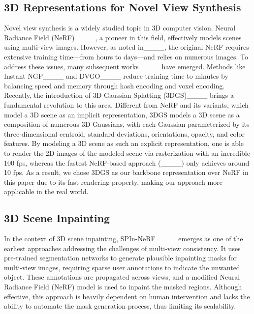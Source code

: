 \subsection{3D Representations for Novel View Synthesis}
\label{subsec:NVS}
Novel view synthesis is a widely studied topic in 3D computer vision. Neural Radiance Field (NeRF)____, a pioneer in this field, effectively models scenes using multi-view images. However, as noted in____, the original NeRF requires extensive training time—from hours to days—and relies on numerous images. To address these issues, many subsequent works____ have emerged. Methods like Instant NGP____ and DVGO____ reduce training time to minutes by balancing speed and memory through hash encoding and voxel encoding. Recently, the introduction of 3D Gaussian Splatting (3DGS)____ brings a fundamental revolution to this area. Different from NeRF and its variants, which model a 3D scene as an implicit representation, 3DGS models a 3D scene as a composition of numerous 3D Gaussians, with each Gaussian parameterized by its three-dimensional centroid, standard deviations, orientations, opacity, and color features. By modeling a 3D scene as such an explicit representation, one is able to render the 2D images of the modeled scene via rasterization with an incredible 100 fps, whereas the fastest NeRF-based approach (____) only achieves around 10 fps. As a result, we chose 3DGS as our backbone representation over NeRF in this paper due to its fast rendering property, making our approach more applicable in the real world. 
 


\subsection{3D Scene Inpainting}
\label{subsec:3Dinpaint}
In the context of 3D scene inpainting, SPIn-NeRF____ emerges as one of the earliest approaches addressing the challenges of multi-view consistency. It uses pre-trained segmentation networks to generate plausible inpainting masks for multi-view images, requiring sparse user annotations to indicate the unwanted object. These annotations are propagated across views, and a modified Neural Radiance Field (NeRF) model is used to inpaint the masked regions. Although effective, this approach is heavily dependent on human intervention and lacks the ability to automate the mask generation process, thus limiting its scalability.




